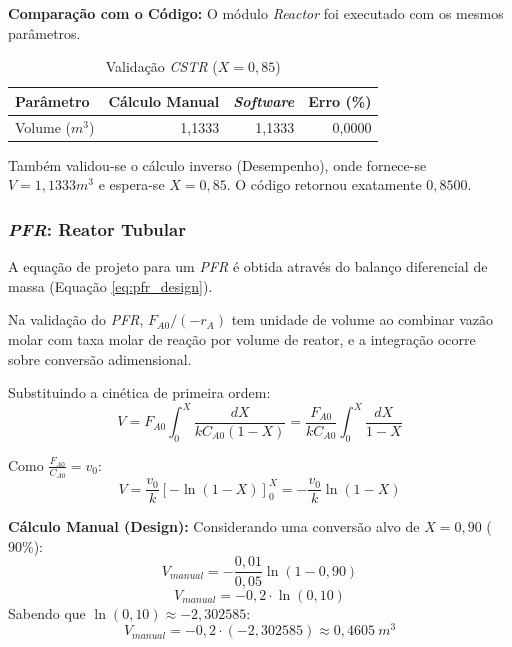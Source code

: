 \textbf{Comparação com o Código:}
O módulo \textit{Reactor} foi executado com os mesmos parâmetros.
\begin{table}[H]
    \centering
    \caption{Validação \textit{CSTR} ($X=0,85$)}
    \begin{tabular}{lrrr}
        \toprule
        \textbf{Parâmetro} & \textbf{Cálculo Manual} & \textbf{\textit{Software}} & \textbf{Erro (\%)} \\
        \midrule
        Volume ($m^3$) & 1,1333 & 1,1333 & 0,0000 \\
        \bottomrule
    \end{tabular}
\end{table}

Também validou-se o cálculo inverso (Desempenho), onde fornece-se $V=1,1333 m^3$ e espera-se $X=0,85$. O código retornou exatamente $0,8500$.

\subsubsection{\textit{PFR}: Reator Tubular}

A equação de projeto para um \textit{PFR} é obtida através do balanço diferencial de massa (Equação \ref{eq:pfr_design}).

Na validação do \textit{PFR}, $F_{A0}/(-r_A)$ tem unidade de volume ao combinar vazão molar com taxa molar de reação por volume de reator, e a integração ocorre sobre conversão adimensional.

Substituindo a cinética de primeira ordem:
\begin{equation}
    V = F_{A0} \int_{0}^{X} \frac{dX}{k C_{A0} (1-X)} = \frac{F_{A0}}{k C_{A0}} \int_{0}^{X} \frac{dX}{1-X}
    \label{eq:val_pfr_deriv_1}
\end{equation}

Como $\frac{F_{A0}}{C_{A0}} = v_0$:
\begin{equation}
    V = \frac{v_0}{k} \left[ -\ln(1-X) \right]_{0}^{X} = -\frac{v_0}{k} \ln(1-X)
    \label{eq:val_pfr_deriv_2}
\end{equation}

\textbf{Cálculo Manual (Design):}
Considerando uma conversão alvo de $X = 0,90$ ($90\%$):
\begin{equation}
    V_{manual} = -\frac{0,01}{0,05} \ln(1 - 0,90)
    \label{eq:val_pfr_calc_1}
\end{equation}
\begin{equation}
    V_{manual} = -0,2 \cdot \ln(0,10)
    \label{eq:val_pfr_calc_2}
\end{equation}
Sabendo que $\ln(0,10) \approx -2,302585$:
\begin{equation}
    V_{manual} = -0,2 \cdot (-2,302585) \approx 0,4605 \ m^3
    \label{eq:val_pfr_calc_3}
\end{equation}

